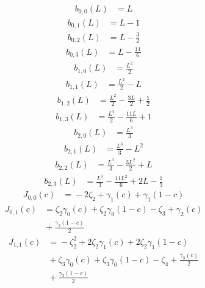 \[
\begin{aligned}
b_{0,0}(L) &={} L
\end{aligned}
\]
\[
\begin{aligned}
b_{0,1}(L) &={} L - 1
\end{aligned}
\]
\[
\begin{aligned}
b_{0,2}(L) &={} L - \frac{3}{2}
\end{aligned}
\]
\[
\begin{aligned}
b_{0,3}(L) &={} L - \frac{11}{6}
\end{aligned}
\]
\[
\begin{aligned}
b_{1,0}(L) &={} \frac{L^{2}}{2}
\end{aligned}
\]
\[
\begin{aligned}
b_{1,1}(L) &={} \frac{L^{2}}{2} - L
\end{aligned}
\]
\[
\begin{aligned}
b_{1,2}(L) &={} \frac{L^{2}}{2} - \frac{3 L}{2} + \frac{1}{2}
\end{aligned}
\]
\[
\begin{aligned}
b_{1,3}(L) &={} \frac{L^{2}}{2} - \frac{11 L}{6} + 1
\end{aligned}
\]
\[
\begin{aligned}
b_{2,0}(L) &={} \frac{L^{3}}{3}
\end{aligned}
\]
\[
\begin{aligned}
b_{2,1}(L) &={} \frac{L^{3}}{3} - L^{2}
\end{aligned}
\]
\[
\begin{aligned}
b_{2,2}(L) &={} \frac{L^{3}}{3} - \frac{3 L^{2}}{2} + L
\end{aligned}
\]
\[
\begin{aligned}
b_{2,3}(L) &={} \frac{L^{3}}{3} - \frac{11 L^{2}}{6} + 2 L - \frac{1}{3}
\end{aligned}
\]
\[
\begin{aligned}
J_{0,0}(c) &={} - 2 \zeta_{2} + \gamma_{1}{\left(c \right)} + \gamma_{1}{\left(1 - c \right)}
\end{aligned}
\]
\[
\begin{aligned}
J_{0,1}(c) &={} \zeta_{2} \gamma_{0}{\left(c \right)} + \zeta_{2} \gamma_{0}{\left(1 - c \right)} - \zeta_{3} + \gamma_{2}{\left(c \right)}\\
&{} + \frac{\gamma_{2}{\left(1 - c \right)}}{2}
\end{aligned}
\]
\[
\begin{aligned}
J_{1,1}(c) &={} - \zeta_{2}^{2} + 2 \zeta_{2} \gamma_{1}{\left(c \right)} + 2 \zeta_{2} \gamma_{1}{\left(1 - c \right)}\\
&{} + \zeta_{3} \gamma_{0}{\left(c \right)} + \zeta_{3} \gamma_{0}{\left(1 - c \right)} - \zeta_{4} + \frac{\gamma_{3}{\left(c \right)}}{2}\\
&{} + \frac{\gamma_{3}{\left(1 - c \right)}}{2}
\end{aligned}
\]
